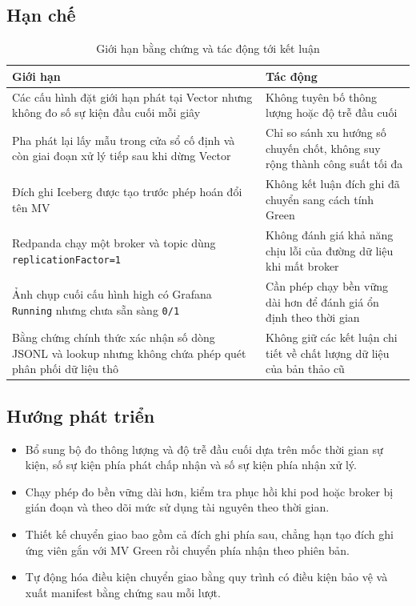 \subsection{Hạn chế}\label{sec:limitations}
\begin{table}[H]
\centering
\caption{Giới hạn bằng chứng và tác động tới kết luận}
\begin{tabularx}{\textwidth}{@{}p{}Y@{}}
\toprule
\textbf{Giới hạn} & \textbf{Tác động}\\
\midrule
Các cấu hình đặt giới hạn phát tại Vector nhưng không đo số sự kiện đầu cuối mỗi giây & Không tuyên bố thông lượng hoặc độ trễ đầu cuối\\
Pha phát lại lấy mẫu trong cửa sổ cố định và còn giai đoạn xử lý tiếp sau khi dừng Vector & Chỉ so sánh xu hướng số chuyến chốt, không suy rộng thành công suất tối đa\\
Đích ghi Iceberg được tạo trước phép hoán đổi tên MV & Không kết luận đích ghi đã chuyển sang cách tính Green\\
Redpanda chạy một broker và topic dùng \texttt{replicationFactor=1} & Không đánh giá khả năng chịu lỗi của đường dữ liệu khi mất broker\\
Ảnh chụp cuối cấu hình high có Grafana \texttt{Running} nhưng chưa sẵn sàng \texttt{0/1} & Cần phép chạy bền vững dài hơn để đánh giá ổn định theo thời gian\\
Bằng chứng chính thức xác nhận số dòng JSONL và lookup nhưng không chứa phép quét phân phối dữ liệu thô & Không giữ các kết luận chi tiết về chất lượng dữ liệu của bản thảo cũ\\
\bottomrule
\end{tabularx}
\end{table}

\subsection{Hướng phát triển}
\begin{itemize}
\item Bổ sung bộ đo thông lượng và độ trễ đầu cuối dựa trên mốc thời gian sự kiện, số sự kiện phía phát chấp nhận và số sự kiện phía nhận xử lý.
\item Chạy phép đo bền vững dài hơn, kiểm tra phục hồi khi pod hoặc broker bị gián đoạn và theo dõi mức sử dụng tài nguyên theo thời gian.
\item Thiết kế chuyển giao bao gồm cả đích ghi phía sau, chẳng hạn tạo đích ghi ứng viên gắn với MV Green rồi chuyển phía nhận theo phiên bản.
\item Tự động hóa điều kiện chuyển giao bằng quy trình có điều kiện bảo vệ và xuất manifest bằng chứng sau mỗi lượt.
\end{itemize}
